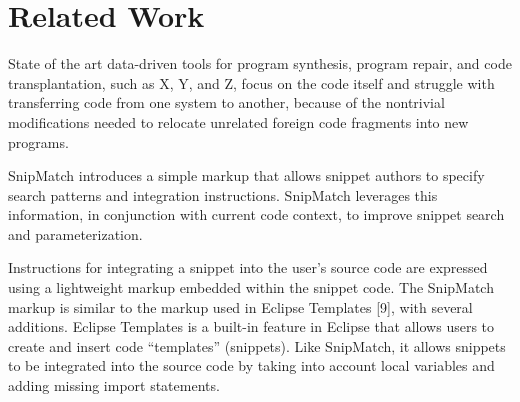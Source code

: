 \section*{Related Work} %
\label{sec:related}

State of the art data-driven tools for program synthesis, program 
repair, and code transplantation, such as X, Y, and Z, focus 
on the code itself and struggle with transferring code from one system 
to another, because of the nontrivial modifications needed to relocate 
unrelated foreign code fragments into new programs. 

SnipMatch introduces a simple markup that allows snippet
authors to specify search patterns and integration instructions.
SnipMatch leverages this information, in conjunction
with current code context, to improve snippet search and
parameterization. 


Instructions for integrating a snippet into the user’s source
code are expressed using a lightweight markup embedded
within the snippet code. The SnipMatch markup is similar
to the markup used in Eclipse Templates [9], with several
additions. Eclipse Templates is a built-in feature in Eclipse
that allows users to create and insert code “templates”
(snippets). Like SnipMatch, it allows snippets to be integrated
into the source code by taking into account local
variables and adding missing import statements. 